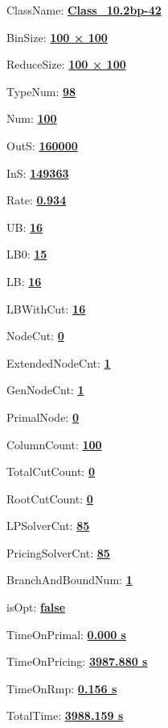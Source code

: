 \documentclass[11pt]{article}
\begin{document}
\pagestyle{empty}


ClassName: \underline{\textbf{Class_10.2bp-42}}
\par
BinSize: \underline{\textbf{100 × 100}}
\par
ReduceSize: \underline{\textbf{100 × 100}}
\par
TypeNum: \underline{\textbf{98}}
\par
Num: \underline{\textbf{100}}
\par
OutS: \underline{\textbf{160000}}
\par
InS: \underline{\textbf{149363}}
\par
Rate: \underline{\textbf{0.934}}
\par
UB: \underline{\textbf{16}}
\par
LB0: \underline{\textbf{15}}
\par
LB: \underline{\textbf{16}}
\par
LBWithCut: \underline{\textbf{16}}
\par
NodeCut: \underline{\textbf{0}}
\par
ExtendedNodeCnt: \underline{\textbf{1}}
\par
GenNodeCnt: \underline{\textbf{1}}
\par
PrimalNode: \underline{\textbf{0}}
\par
ColumnCount: \underline{\textbf{100}}
\par
TotalCutCount: \underline{\textbf{0}}
\par
RootCutCount: \underline{\textbf{0}}
\par
LPSolverCnt: \underline{\textbf{85}}
\par
PricingSolverCnt: \underline{\textbf{85}}
\par
BranchAndBoundNum: \underline{\textbf{1}}
\par
isOpt: \underline{\textbf{false}}
\par
TimeOnPrimal: \underline{\textbf{0.000 s}}
\par
TimeOnPricing: \underline{\textbf{3987.880 s}}
\par
TimeOnRmp: \underline{\textbf{0.156 s}}
\par
TotalTime: \underline{\textbf{3988.159 s}}
\par
\newpage


\end{document}
